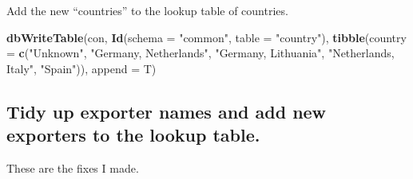 \documentclass[]{article}
\newenvironment{Shaded}{\begin{snugshade}}{\end{snugshade}}
\newcommand{\DataTypeTok}[1]{\textcolor[rgb]{0.13,0.29,0.53}{#1}}
\newcommand{\KeywordTok}[1]{\textcolor[rgb]{0.13,0.29,0.53}{\textbf{#1}}}
\newcommand{\NormalTok}[1]{#1}
\newcommand{\OperatorTok}[1]{\textcolor[rgb]{0.81,0.36,0.00}{\textbf{#1}}}
\newcommand{\OtherTok}[1]{\textcolor[rgb]{0.56,0.35,0.01}{#1}}
\newcommand{\StringTok}[1]{\textcolor[rgb]{0.31,0.60,0.02}{#1}}
\begin{document}
Add the new ``countries'' to the lookup table of countries.

\begin{Shaded}
\begin{Highlighting}[]
\KeywordTok{dbWriteTable}\NormalTok{(con,}
             \KeywordTok{Id}\NormalTok{(}\DataTypeTok{schema =} \StringTok{"common"}\NormalTok{, }\DataTypeTok{table =} \StringTok{"country"}\NormalTok{),}
             \KeywordTok{tibble}\NormalTok{(}\DataTypeTok{country =} \KeywordTok{c}\NormalTok{(}\StringTok{"Unknown"}\NormalTok{,}
                                \StringTok{"Germany, Netherlands"}\NormalTok{,}
                                \StringTok{"Germany, Lithuania"}\NormalTok{,}
                                \StringTok{"Netherlands, Italy"}\NormalTok{,}
                                \StringTok{"Spain"}\NormalTok{)),}
             \DataTypeTok{append =}\NormalTok{ T)}
\end{Highlighting}
\end{Shaded}

\hypertarget{tidy-up-exporter-names-and-add-new-exporters-to-the-lookup-table.}{%
\subsection{Tidy up exporter names and add new exporters to the lookup
table.}\label{tidy-up-exporter-names-and-add-new-exporters-to-the-lookup-table.}}

\begin{Shaded}
\end{Shaded}

These are the fixes I made.
\end{document}
